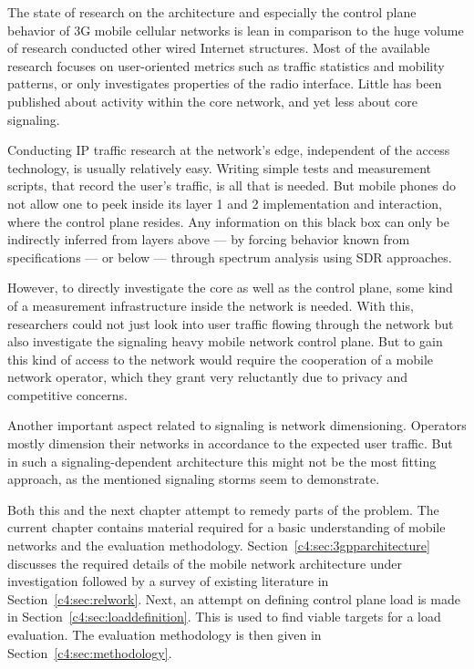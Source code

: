 The state of research on the architecture and especially the control plane behavior of \gls{3G} mobile cellular networks is lean in comparison to the huge volume of research conducted other wired Internet structures. Most of the available research focuses on user-oriented metrics such as traffic statistics and mobility patterns, or only investigates properties of the radio interface. Little has been published about activity within the core network, and yet less about core signaling. 

Conducting \gls{IP} traffic research at the network's edge, independent of the access technology, is usually relatively easy. Writing simple tests and measurement scripts, that record the user's traffic, is all that is needed. But mobile phones do not allow one to peek inside its layer 1 and 2 implementation and interaction, where the control plane resides. Any information on this black box can only be indirectly inferred from layers above --- by forcing behavior known from specifications --- or below --- through spectrum analysis using \gls{SDR} approaches. 

However, to directly investigate the core as well as the control plane, some kind of a measurement infrastructure inside the network is needed. With this, researchers could not just look into user traffic flowing through the network but also investigate the signaling heavy mobile network control plane. But to gain this kind of access to the network would require the cooperation of a mobile network operator, which they grant very reluctantly due to privacy and competitive concerns.

Another important aspect related to signaling is network dimensioning. Operators mostly dimension their networks in accordance to the expected user traffic. But in such a signaling-dependent architecture this might not be the most fitting approach, as the mentioned signaling storms seem to demonstrate. 

Both this and the next chapter attempt to remedy parts of the problem. The current chapter contains material required for a basic understanding of mobile networks and the evaluation methodology. Section~\ref{c4:sec:3gpparchitecture} discusses the required details of the mobile network architecture under investigation followed by a survey of existing literature in Section~\ref{c4:sec:relwork}. Next, an attempt on defining control plane load is made in Section~\ref{c4:sec:loaddefinition}. This is used to find viable targets for a load evaluation. The evaluation methodology is then given in Section~\ref{c4:sec:methodology}.

